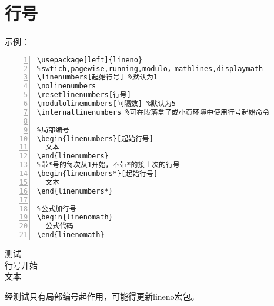 \section{行号}
示例：
\begin{Verbatim}[formatcom=\color{grass},frame=single,numbers=left]
\usepackage[left]{lineno}
%swtich,pagewise,running,modulo，mathlines,displaymath
\linenumbers[起始行号] %默认为1
\nolinenumbers
\resetlinenumbers[行号]
\modulolinemumbers[间隔数] %默认为5
\internallinenumbers %可在段落盒子或小页环境中使用行号起始命令

%局部编号
\begin{linenumbers}[起始行号]
  文本
\end{linenumbers}
%带*号的每次从1开始，不带*的接上次的行号
\begin{linenumbers*}[起始行号]
  文本
\end{linenumbers*}

%公式加行号
\begin{linenomath}
  公式代码
\end{linenomath}
\end{Verbatim}

\begin{linenumbers}[10]
测试\\
行号开始\\
文本\\
\end{linenumbers}

经测试只有局部编号起作用，可能得更新lineno宏包。
